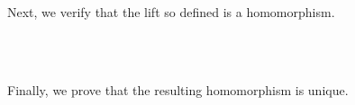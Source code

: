 \ccpad
Next, we verify that the lift so defined is a homomorphism.
\ccpad
\begin{code}%
\>[0][@{}l@{\AgdaIndent{1}}]%
\>[1]\AgdaSpace{}%
\AgdaSymbol{:}\AgdaSpace{}%
\AgdaSymbol{(}\AgdaSpace{}%
\AgdaSymbol{:}\AgdaSpace{}%
\AgdaSpace{}%
\AgdaSpace{}%
\AgdaSymbol{)}\AgdaSpace{}%
\AgdaSpace{}%
\AgdaSymbol{(}\AgdaSpace{}%
\AgdaSpace{}%
\AgdaSpace{}%
\AgdaSpace{}%
\AgdaSymbol{)}\AgdaSpace{}%
\AgdaSpace{}%
\AgdaSpace{}%
\AgdaSymbol{(}\AgdaSpace{}%
\AgdaSymbol{)}\AgdaSpace{}%
\<%
\\
%
\\[\AgdaEmptyExtraSkip]%
%
\>[1]\AgdaSpace{}%
\AgdaSpace{}%
\AgdaSpace{}%
\AgdaSymbol{=}\AgdaSpace{}%
\AgdaSpace{}%
\AgdaSpace{}%
\AgdaSpace{}%
\AgdaOperator{\AgdaInductiveConstructor{,}}\AgdaSpace{}%
\AgdaSpace{}%
\AgdaSpace{}%
\AgdaSpace{}%
\AgdaSpace{}%
\AgdaSpace{}%
\AgdaSymbol{(\AgdaUnderscore{}}\AgdaSpace{}%
\AgdaSpace{}%
\AgdaSymbol{)}\AgdaSpace{}%
\<%
\end{code}
\ccpad
Finally, we prove that the resulting homomorphism is unique.
\ccpad
